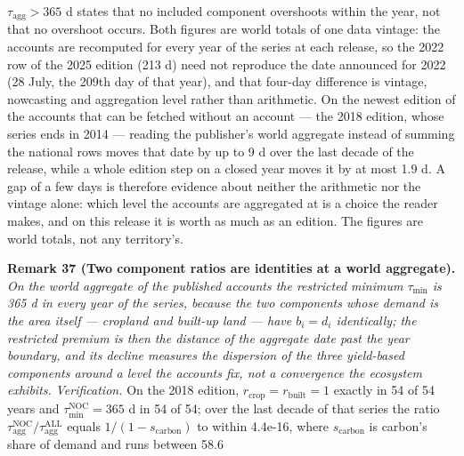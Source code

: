 \documentclass[11pt]{article}
\begin{document}
\(\tau_{\mathrm{agg}} > 365\) d states that no included component overshoots within the year, not that no
overshoot occurs. Both figures are world totals of one data vintage: the accounts are recomputed for every
year of the series at each release, so the 2022 row of the 2025 edition (213 d) need not reproduce the date
announced for 2022 (28 July, the 209th day of that year), and that four-day difference is vintage, nowcasting and aggregation level rather than arithmetic. On the newest edition of the accounts that can be fetched without an account --- the 2018 edition, whose series ends in 2014 --- reading the publisher's world aggregate instead of summing the national rows moves that date by up to 9 d over the last decade of the release, while a whole edition step on a closed year moves it by at most 1.9 d. A gap of a few days is therefore evidence about neither the arithmetic nor the vintage alone: which level the accounts are aggregated at is a choice the reader makes, and on this release it is worth as much as an edition. The figures are world totals, not any territory's.


\textbf{Remark 37 (Two component ratios are identities at a world aggregate).} \emph{On the world aggregate of the published accounts the restricted minimum \(\tau_{\min}\) is 365 d in every year of the series, because the two components whose demand is the area itself --- cropland and built-up land --- have \(b_i = d_i\) identically; the restricted premium is then the distance of the aggregate date past the year boundary, and its decline measures the dispersion of the three yield-based components around a level the accounts fix, not a convergence the ecosystem exhibits.} \emph{Verification.} On the 2018 edition, \(r_{\mathrm{crop}} = r_{\mathrm{built}} = 1\) exactly in 54 of 54 years and \(\tau_{\min}^{\mathrm{NOC}} = 365\) d in 54 of 54; over the last decade of that series the ratio \(\tau_{\mathrm{agg}}^{\mathrm{NOC}}/\tau_{\mathrm{agg}}^{\mathrm{ALL}}\) equals \(1/(1-s_{\mathrm{carbon}})\) to within 4.4e-16, where \(s_{\mathrm{carbon}}\) is carbon's share of demand and runs between 58.6%
\end{document}
